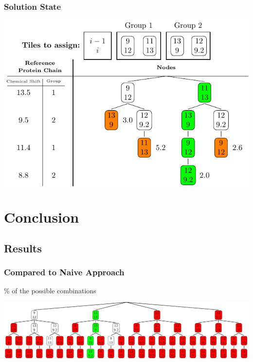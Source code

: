 \documentclass{beamer}
\begin{document}
\begin{frame}
	\frametitle{Solution State}
	\vspace{-.5cm} 
	\center
	\includegraphics[width=.9\textwidth]{tilePlacement/step10}
\end{frame}



\section{Conclusion} 

\subsection{Results}
\begin{frame}
	\frametitle{Compared to Naive Approach}
	\vspace{-24pt}
	\% of the possible combinations

	\vspace{24pt}
	\center
	\includegraphics[width=\textwidth]{tilePlacement/naive}
\end{frame}
\end{document}
